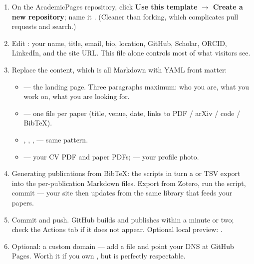 \documentclass[11pt,a4paper]{article}
\begin{document}
\begin{enumerate}
  \item On the AcademicPages repository, click \textbf{Use this template}
        $\rightarrow$ \textbf{Create a new repository}; name it
        . (Cleaner than forking, which complicates
        pull requests and search.)
  \item Edit : your name, title, email, bio, location,
        GitHub, Scholar, ORCID, LinkedIn, and the site URL. This file alone
        controls most of what visitors see.
  \item Replace the content, which is all Markdown with YAML front matter:
        \begin{itemize}
          \item {} --- the landing page. Three paragraphs
                maximum: who you are, what you work on, what you are looking
                for.
          \item {} --- one file per paper (title, venue,
                date, links to PDF / arXiv / code / BibTeX).
          \item {}, , ,
                 --- same pattern.
          \item {} --- your CV PDF and paper PDFs;
                 --- your profile photo.
        \end{itemize}
  \item Generating publications from BibTeX: the scripts in
         turn a  or TSV export into the
        per-publication Markdown files. Export from Zotero, run the script,
        commit --- your site then updates from the same library that feeds
        your papers.
  \item Commit and push. GitHub builds and publishes within a minute or two;
        check the Actions tab if it does not appear. Optional local preview:
        .
  \item Optional: a custom domain --- add a  file and point your
        DNS at GitHub Pages. Worth it if you own ,
        but  is perfectly respectable.
\end{enumerate}
\end{document}
